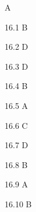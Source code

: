 \begin{Solution}{16}
A
\end{Solution}
\begin{Solution}{16.{1}}
B
\end{Solution}
\begin{Solution}{16.{2}}
D
\end{Solution}
\begin{Solution}{16.{3}}
D
\end{Solution}
\begin{Solution}{16.{4}}
B
\end{Solution}
\begin{Solution}{16.{5}}
A
\end{Solution}
\begin{Solution}{16.{6}}
C
\end{Solution}
\begin{Solution}{16.{7}}
D
\end{Solution}
\begin{Solution}{16.{8}}
B
\end{Solution}
\begin{Solution}{16.{9}}
A
\end{Solution}
\begin{Solution}{16.{10}}
B
\end{Solution}
